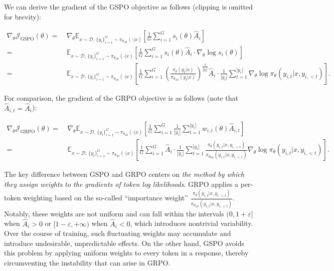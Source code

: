 We can derive the gradient of the GSPO objective as follows (clipping is omitted for brevity):

\begin{align}
\nabla_{\theta} \mathcal{J}_\text{GSPO} (\theta)
=&\ 
\nabla_{\theta} \mathbb{E}_{ x \sim \mathcal{D},\, \{y_i\}_{i=1}^G \sim \pi_{\theta_\text{old}}( \cdot | x) }
\left[ 
\frac{1}{G} \sum_{i=1}^{G} s_{i}(\theta) \widehat{A}_{i}
\right] \\
= &\ 
\mathbb{E}_{ x \sim \mathcal{D},\, \{y_i\}_{i=1}^G \sim \pi_{\theta_\text{old}}( \cdot | x) }
\left[ 
\frac{1}{G} \sum_{i=1}^{G}
s_{i}(\theta) \widehat{A}_{i}
\cdot \nabla_{\theta} \log s_{i}(\theta)
\right] \\
=&\ 
\mathbb{E}_{ x \sim \mathcal{D},\, \{y_i\}_{i=1}^G \sim \pi_{\theta_\text{old}}( \cdot | x) }
\left[ 
\frac{1}{G} \sum_{i=1}^{G} 
\left( \frac{ \pi_{\theta} (y_i | x) }{ \pi_{\theta_\text{old}} (y_i | x)} \right)^{\frac{1}{|y_i|}} \widehat{A}_{i} 
\cdot \frac{1}{|y_i|} \sum_{t=1}^{|y_i|} \nabla_{\theta} \log \pi_{\theta} (y_{i,t} | x, y_{i,<t}) 
\right].
\label{equ:gspo_grad}
\end{align}

For comparison, the gradient of the GRPO objective is as follows (note that $\widehat{A}_{i,t} = \widehat{A}_{i}$):

\begin{align}
\nabla_{\theta} \mathcal{J}_\text{GRPO} (\theta) 
=&\ 
\nabla_{\theta} \mathbb{E}_{ x \sim \mathcal{D},\, \{y_i\}_{i=1}^G \sim \pi_{\theta_\text{old}}( \cdot | x) }
\left[ \frac{1}{G} \sum_{i=1}^{G} \frac{1}{|y_i|} \sum_{t=1}^{|y_i|} 
w_{i,t}(\theta) \widehat{A}_{i,t}
\right] \\
=&\
\mathbb{E}_{ x \sim \mathcal{D},\, \{y_i\}_{i=1}^G \sim \pi_{\theta_\text{old}}( \cdot | x) }
\left[ \frac{1}{G} \sum_{i=1}^{G} \widehat{A}_{i} 
\cdot \frac{1}{|y_i|} \sum_{t=1}^{|y_i|} 
\frac{ \pi_{\theta} (y_{i,t} | x, y_{i,<t}) }{ \pi_{\theta_\text{old}} (y_{i,t} | x,y_{i,<t})} 
\nabla_{\theta} \log \pi_{\theta} (y_{i,t} | x, y_{i,<t})  
\right].
\end{align}

The key difference between GSPO and GRPO centers on \textit{the method by which they assign weights to the gradients of token log likelihoods}. GRPO applies a per-token weighting based on the so-called ``importance weight'' $\frac{ \pi_{\theta} (y_{i,t} | x, y_{i,<t}) }{ \pi_{\theta_\text{old}} (y_{i,t} | x,y_{i,<t})}$. Notably, these weights are not uniform and can fall within the intervals $(0, 1+\varepsilon]$ when $\widehat{A}_{i} >0$ or $[1-\varepsilon, +\infty)$ when $\widehat{A}_{i} < 0$, which introduces nontrivial variability. Over the course of training, such fluctuating weights may accumulate and introduce undesirable, unpredictable effects. On the other hand, GSPO avoids this problem by applying uniform weights to every token in a response, thereby circumventing the instability that can arise in GRPO.

